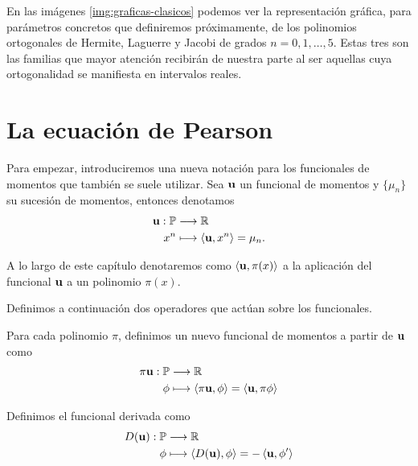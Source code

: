 En las imágenes \ref{img:graficas-clasicos} podemos ver la representación gráfica, para parámetros concretos que definiremos próximamente, de los polinomios ortogonales de Hermite, Laguerre y Jacobi de grados $n=0,1,\dots,5$. Estas tres son las familias que mayor atención recibirán de nuestra parte al ser aquellas cuya ortogonalidad se manifiesta en intervalos reales.

\section{La ecuación de Pearson}

Para empezar, introduciremos una nueva notación para los funcionales de momentos que también se suele utilizar. Sea $\mathbf{u}$ un funcional de momentos y $\{\mu_n\}$ su sucesión de momentos, entonces denotamos
\begin{equation}
    \label{eq:nueva-notacion-funcional}
    \begin{split}
        \mathbf{u}:\mathbb P & \longrightarrow \mathbb{R} \\
        x^n & \longmapsto \left\langle \mathbf{u}, x^n \right\rangle = \mu_n.
    \end{split}
\end{equation}

A lo largo de este capítulo denotaremos como $\left\langle \mathbf{u} , \pi(x) \right\rangle$ a la aplicación del funcional $\mathbf{u}$ a un polinomio $\pi(x)$.

Definimos a continuación dos operadores que actúan sobre los funcionales.

\begin{definicion}
    Para cada polinomio $\pi$, definimos un nuevo funcional de momentos a partir de $\mathbf{u}$ como
    \begin{equation}
        \begin{split}
            \pi\mathbf{u}:\mathbb P & \longrightarrow \mathbb{R} \\
            \phi & \longmapsto \left\langle \pi\mathbf{u} , \phi \right\rangle=\left\langle \mathbf{u} , \pi\phi \right\rangle
        \end{split}
    \end{equation}
    
\end{definicion}

\begin{definicion}[Derivada]
    Definimos el funcional derivada como
    \begin{equation}
        \begin{split}
            D(\mathbf{u}):\mathbb P & \longrightarrow \mathbb{R} \\
            \phi & \longmapsto \left\langle D(\mathbf{u}) , \phi \right\rangle=-\left\langle \mathbf{u} , \phi' \right\rangle
        \end{split}
    \end{equation}
    
\end{definicion}

